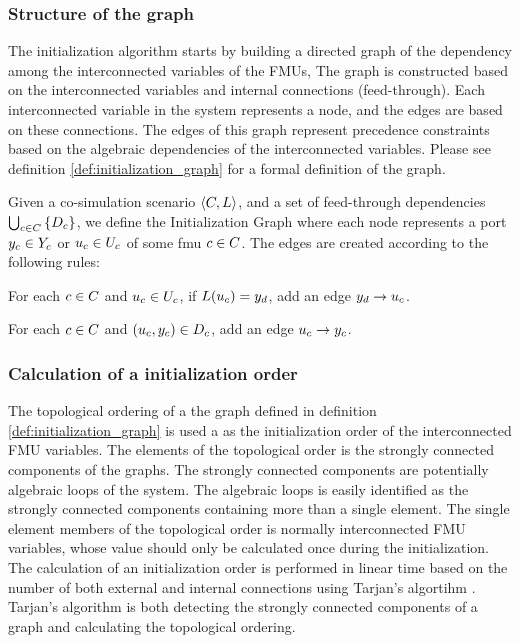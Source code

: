 \documentclass[runningheads]{llncs}
\begin{document}
\subsubsection{Structure of the graph}
The initialization algorithm starts by building a directed graph of the dependency among the interconnected variables of the FMUs, The graph is constructed based on the interconnected variables and internal connections (feed-through). Each interconnected variable in the system represents a node, and the edges are based on these connections. The edges of this graph represent precedence constraints based on the algebraic dependencies of the interconnected variables. Please see definition \ref{def:initialization_graph} for a formal definition of the graph.

\begin{definition}\label{def:initialization_graph}
  Given a co-simulation scenario $ \left\langle C, L \right\rangle $, and a set of feed-through dependencies $\bigcup_{c \in C}  \left\{ D_{c} \right\}$, we define the Initialization Graph where each node represents a port $y_{c} \in Y_{c}$ or $u_{c} \in U_{c}$ of some fmu $c \in C$. The edges are created according to the following rules:
  \begin{compactenum}
    \item For each $c \in C$ and $u_{c} \in U_{c}$, if $L(u_{c}) = y_{d}$, add an edge $y_{d} -> u_{c}$.
    \item For each $c \in C$ and $(u_{c},y_{c}) \in D_{c}$, add an edge $u_{c} -> y_{c}$.
  \end{compactenum}
\end{definition}

\subsubsection{Calculation of a initialization order}
The topological ordering of a the graph defined in definition \ref{def:initialization_graph} is used a as the initialization order of the interconnected FMU variables. The elements of the topological order is the strongly connected components of the graphs. The strongly connected components are potentially algebraic loops of the system. The algebraic loops is easily identified as the strongly connected components containing more than a single element. The single element members of the topological order is normally interconnected FMU variables, whose value should only be calculated once during the initialization. \\
The calculation of an initialization order is performed in linear time based on the number of both external and internal connections using Tarjan's algortihm \cite{tarjan_1972}. Tarjan's algorithm is both detecting the strongly connected components of a graph and calculating the topological ordering.
\end{document}
